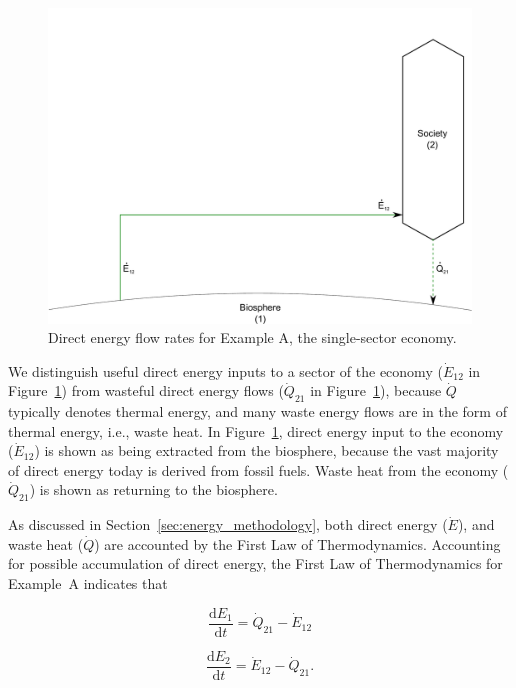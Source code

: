 \begin{figure}[h!]
\centering
\includegraphics[width=0.8\linewidth]{Part_2/Chapter_Energy/images/1_sector_direct_energy.pdf}
\caption{Direct energy flow rates for Example A, the single-sector economy.}
\label{fig:A_energy}
\end{figure}

We distinguish useful direct energy inputs to a sector of the economy
($\dot{E}_{12}$ in Figure~\ref{fig:A_energy}) from wasteful direct energy flows 
($\dot{Q}_{21}$ in Figure~\ref{fig:A_energy}), 
because $\dot{Q}$ typically denotes thermal energy, 
and many waste energy flows are in the form of thermal
energy, i.e., waste heat. In Figure~\ref{fig:A_energy}, direct energy input to the 
economy ($\dot{E}_{12}$) is shown as being extracted from the biosphere, because
the vast majority of direct energy today is derived from fossil fuels.
Waste heat from the economy ($\dot{Q}_{21}$) is shown as returning 
to the biosphere.

As discussed in Section~\ref{sec:energy_methodology}, 
both direct energy ($\dot{E}$), and waste heat ($\dot{Q}$) 
are accounted by the First Law of Thermodynamics. 
Accounting for possible accumulation of direct energy, 
the First Law of Thermodynamics for Example~A indicates that

\begin{equation} \label{eq:dE_1/dt_single_sector}
	\frac{\mathrm{d}E_1}{\mathrm{d}t} 
	= \dot{Q}_{21} 
	- \dot{E}_{12}
\end{equation}

\begin{equation} \label{eq:dE_2/dt_single_sector}
	\frac{\mathrm{d}E_{2}}{\mathrm{d}t} 
	= \dot{E}_{12} 
	- \dot{Q}_{21}.
\end{equation}

